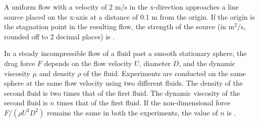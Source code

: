 \iffalse
    \title{Assignment}
    \author{EE24BTECH11063}
    \section{ce}
    \chapter{2012}
  \fi


    \item A uniform flow with a velocity of 2 m/s in the x-direction approaches a line source placed on the x-axis at a distance of 0.1 m from the origin. If the origin is the stagnation point in the resulting flow, the strength of the source (in m$^2$/s, rounded off to 2 decimal places) is \underline{\hspace{1cm}}.
\bigskip

\item In a steady incompressible flow of a fluid past a smooth stationary sphere, the drag force $F$ depends on the flow velocity $U$, diameter $D$, and the dynamic viscosity $\mu$ and density $\rho$ of the fluid. Experiments are conducted on the same sphere at the same flow velocity using two different fluids. The density of the second fluid is two times that of the first fluid. The dynamic viscosity of the second fluid is $n$ times that of the first fluid. If the non-dimensional force $F / (\rho U^2 D^2)$ remains the same in both the experiments, the value of $n$ is \underline{\hspace{1cm}}.
\bigskip

